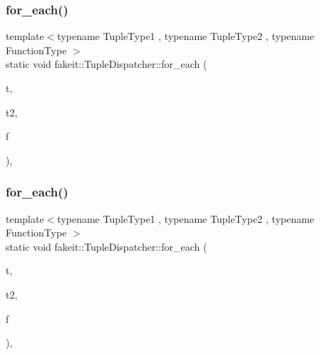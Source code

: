 \mbox{\label{structfakeit_1_1TupleDispatcher_a1ddb90f24aa73dd61bf2b95c5f176cd5}} 
\subsubsection{\texorpdfstring{for\_each()}{for\_each()}\hspace{0.1cm}{\footnotesize\ttfamily [28/54]}}
{\footnotesize\ttfamily template$<$typename Tuple\+Type1 , typename Tuple\+Type2 , typename Function\+Type $>$ \\
static void fakeit\+::\+Tuple\+Dispatcher\+::for\+\_\+each (\begin{DoxyParamCaption}\item[{Tuple\+Type1 \&\&}]{t,  }\item[{Tuple\+Type2 \&\&}]{t2,  }\item[{Function\+Type \&}]{f }\end{DoxyParamCaption})\hspace{0.3cm}{\ttfamily [inline]}, {\ttfamily [static]}}

\mbox{\label{structfakeit_1_1TupleDispatcher_a1ddb90f24aa73dd61bf2b95c5f176cd5}} 
\subsubsection{\texorpdfstring{for\_each()}{for\_each()}\hspace{0.1cm}{\footnotesize\ttfamily [29/54]}}
{\footnotesize\ttfamily template$<$typename Tuple\+Type1 , typename Tuple\+Type2 , typename Function\+Type $>$ \\
static void fakeit\+::\+Tuple\+Dispatcher\+::for\+\_\+each (\begin{DoxyParamCaption}\item[{Tuple\+Type1 \&\&}]{t,  }\item[{Tuple\+Type2 \&\&}]{t2,  }\item[{Function\+Type \&}]{f }\end{DoxyParamCaption})\hspace{0.3cm}{\ttfamily [inline]}, {\ttfamily [static]}}

